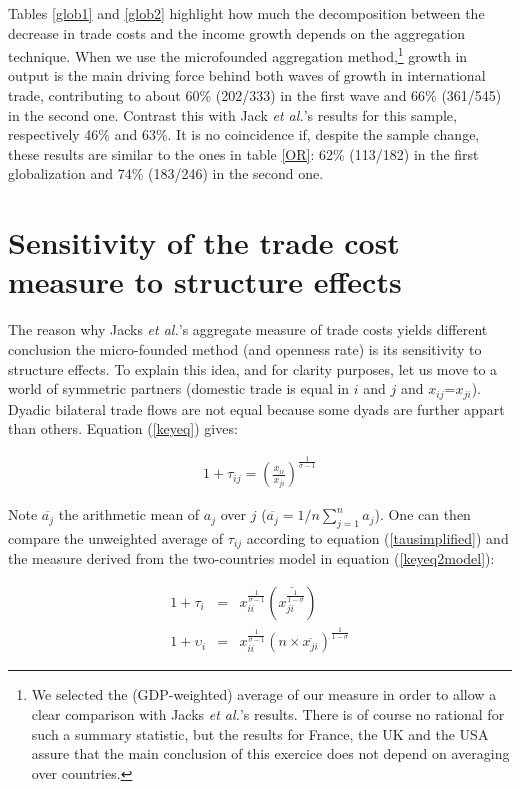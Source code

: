 \documentclass{article}
\begin{document}
Tables \ref{glob1} and \ref{glob2} highlight how much the decomposition
between the decrease in trade costs and the income growth depends on the aggregation technique. When we use the microfounded aggregation method,\footnote{We selected the (GDP-weighted) average of our measure in order
to allow a clear comparison with Jacks \textit{et al.}'s results. There
is of course no rational for such a summary statistic, but the
results for France, the UK and the USA assure that the main
conclusion of this exercice does not depend on averaging over
countries.} 
growth in output is the main driving force behind both waves of growth in international trade, contributing to about 60\% (202/333) in the first wave and 66\% (361/545) in the second one. Contrast this with Jack  \textit{et al.}'s results for this sample, respectively 46\% and 63\%.
It is no coincidence if, despite the sample change, these results are similar to the ones in table \ref{OR}: 62\% (113/182) in the first globalization and 74\% (183/246) in the second one.

\section{\label{3} Sensitivity of the trade cost measure to
structure effects}

The reason why Jacks \textit{et al.}'s aggregate measure of trade costs yields different conclusion the micro-founded method (and openness rate) is its sensitivity to structure
effects. To explain this idea, and for clarity purposes, let us move to a world of symmetric partners (domestic trade is equal in $i$ and $j$ and $x_{ij}$=$x_{ji}$).  Dyadic bilateral trade flows are not equal because some dyads are further appart than others. Equation (\ref{keyeq}) gives: 

\begin{eqnarray}
1+\tau_{ij}= \left(\frac{x_{ii}}{x_{ji}}\right)^{\frac{1}{\sigma-1}}\label{tausimplified}
\end{eqnarray}

Note $\overline{a_j}$ the arithmetic mean
of $a_j$ over $j$ ($\overline{a_j}=1/n \sum_{j=1}^{n}a_j$). One can
then compare the unweighted average of $\tau_{ij}$ according to equation 
(\ref{tausimplified}) and the measure derived from the
two-countries model in equation (\ref{keyeq2model}):

\begin{eqnarray}
1+\tau_i&=& x_{ii}^{\frac{1}{\sigma-1}} \left(\overline{{x_{ji}^{\frac{1}{1-\sigma}}}}\right) \label{tau}\\
1+\upsilon_i&=&x_{ii}^{\frac{1}{\sigma-1}} (n \times \overline{x_{ji}})^{\frac{1}{1-\sigma}}\label{upsilon}
\end{eqnarray}
\end{document}
